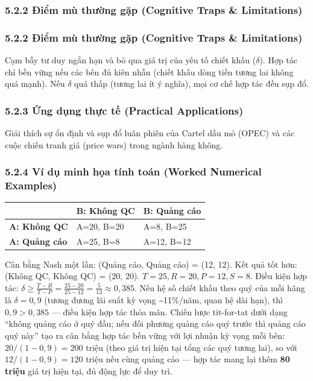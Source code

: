 \documentclass[
]{article}
\newcounter{none} %
\begin{document}
\subsubsection{5.2.2 Điểm mù thường gặp (Cognitive Traps \&
Limitations)}\label{ux111iux1ec3m-muxf9-thux1b0ux1eddng-gux1eb7p-cognitive-traps-limitations-3}

\subsubsection{5.2.2 Điểm mù thường gặp (Cognitive Traps \&
Limitations)}\label{ux111iux1ec3m-muxf9-thux1b0ux1eddng-gux1eb7p-cognitive-traps-limitations-4}

Cạm bẫy tư duy ngắn hạn và bỏ qua giá trị của yếu tố chiết khấu
(\(\delta\)). Hợp tác chỉ bền vững nếu các bên đủ kiên nhẫn (chiết khấu
dòng tiền tương lai không quá mạnh). Nếu \(\delta\) quá thấp (tương lai
ít ý nghĩa), mọi cơ chế hợp tác đều sụp đổ.

\subsubsection{5.2.3 Ứng dụng thực tế (Practical
Applications)}\label{ux1ee9ng-dux1ee5ng-thux1ef1c-tux1ebf-practical-applications-3}

Giải thích sự ổn định và sụp đổ luân phiên của Cartel dầu mỏ (OPEC) và
các cuộc chiến tranh giá (price wars) trong ngành hàng không.

\subsubsection{5.2.4 Ví dụ minh họa tính toán (Worked Numerical
Examples)}\label{vuxed-dux1ee5-minh-hux1ecda-tuxednh-touxe1n-worked-numerical-examples-2}

{\def\LTcaptype{none} %
\begin{longtable}[]{@{}lll@{}}
\toprule\noalign{}
& \textbf{B: Không QC} & \textbf{B: Quảng cáo} \\
\midrule\noalign{}
\endhead
\bottomrule\noalign{}
\endlastfoot
\textbf{A: Không QC} & A=20, B=20 & A=8, B=25 \\
\textbf{A: Quảng cáo} & A=25, B=8 & A=12, B=12 \\
\end{longtable}
}

Cân bằng Nash một lần: (Quảng cáo, Quảng cáo) = (12, 12). Kết quả tốt
hơn: (Không QC, Không QC) = (20, 20). \(T=25, R=20, P=12, S=8\). Điều
kiện hợp tác:
\(\delta \ge \frac{T-R}{T-P} = \frac{25-20}{25-12} = \frac{5}{13} \approx 0{,}385\).
Nếu hệ số chiết khấu theo quý của mỗi hãng là \(\delta = 0{,}9\) (tương
đương lãi suất kỳ vọng \textasciitilde11\%/năm, quan hệ dài hạn), thì
\(0{,}9 > 0{,}385\) --- điều kiện hợp tác thỏa mãn. Chiến lược
tit-for-tat dưới dạng ``không quảng cáo ở quý đầu; nếu đối phương quảng
cáo quý trước thì quảng cáo quý này'' tạo ra cân bằng hợp tác bền vững
với lợi nhuận kỳ vọng mỗi bên: \(20/(1-0{,}9) = 200\) triệu (theo giá
trị hiện tại tổng các quý tương lai), so với \(12/(1-0{,}9) = 120\)
triệu nếu cùng quảng cáo --- hợp tác mang lại thêm \textbf{80 triệu} giá
trị hiện tại, đủ động lực để duy trì.
\end{document}
